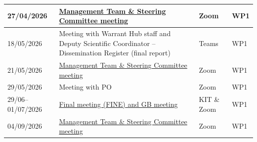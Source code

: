 \begin{longtable}{|L{0.18\textwidth}|C{0.48\textwidth}|C{0.12\textwidth}|C{0.10\textwidth}|}
27/04/2026 &
\href{https://agenda.infn.it/event/52026/}
{Management Team \& Steering Committee meeting} &
Zoom & WP1 \\ \hline

18/05/2026 &
Meeting with Warrant Hub staff and Deputy Scientific
Coordinator -- Dissemination Register (final report) &
Teams & WP1 \\ \hline

21/05/2026 &
\href{https://agenda.infn.it/event/52457/}
{Management Team \& Steering Committee meeting} &
Zoom & WP1 \\ \hline

29/05/2026 &
Meeting with PO &
Zoom & WP1 \\ \hline

29/06--01/07/2026 &
\href{https://indico.kit.edu/event/5341/}
{Final meeting (FINE) and GB meeting} &
KIT \& Zoom & WP1 \\ \hline

04/09/2026 &
\href{https://agenda.infn.it/event/51351/}
{Management Team \& Steering Committee meeting} &
Zoom & WP1 \\ \hline

\end{longtable}




